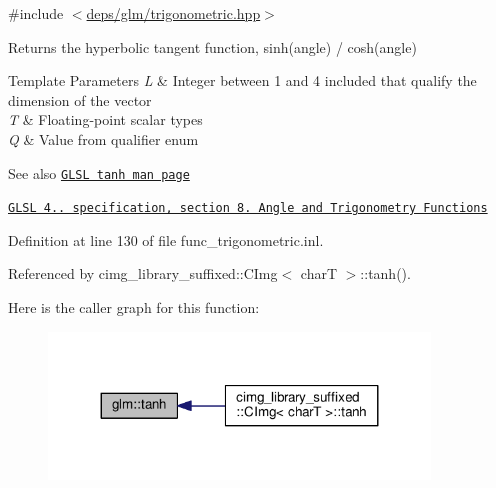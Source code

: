 {\ttfamily \#include $<$\hyperlink{trigonometric_8hpp}{deps/glm/trigonometric.\+hpp}$>$}

Returns the hyperbolic tangent function, sinh(angle) / cosh(angle)


\begin{DoxyTemplParams}{Template Parameters}
{\em L} & Integer between 1 and 4 included that qualify the dimension of the vector \\
\hline
{\em T} & Floating-\/point scalar types \\
\hline
{\em Q} & Value from qualifier enum\\
\hline
\end{DoxyTemplParams}
\begin{DoxySeeAlso}{See also}
\href{http://www.opengl.org/sdk/docs/manglsl/xhtml/tanh.xml}{\tt G\+L\+SL tanh man page} 

\href{http://www.opengl.org/registry/doc/GLSLangSpec.4.20.8.pdf}{\tt G\+L\+SL 4.. specification, section 8. Angle and Trigonometry Functions} 
\end{DoxySeeAlso}


Definition at line 130 of file func\+\_\+trigonometric.\+inl.



Referenced by cimg\+\_\+library\+\_\+suffixed\+::\+C\+Img$<$ char\+T $>$\+::tanh().

Here is the caller graph for this function\+:
\nopagebreak
\begin{figure}[H]
\begin{center}
\leavevmode
\includegraphics[width=287pt]{dc/d43/group__core__func__trigonometric_gaa1bccbfdcbe40ed2ffcddc2aa8bfd0f1_icgraph}
\end{center}
\end{figure}

